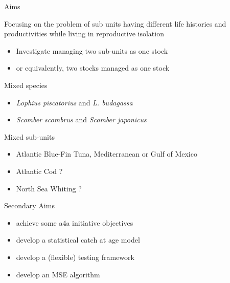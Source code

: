 \documentclass{beamer}
\begin{document}
\begin{withoutheadline}
\begin{frame}{Aims}

  Focusing on the problem of sub units having different life histories and productivities while living in reproductive isolation

  \begin{itemize}
      \item Investigate managing two sub-units as one stock
      \item or equivalently, two stocks managed as one stock
  \end{itemize}

  \pause  
  Mixed species
  \begin{itemize}
    \item \textit{Lophius piscatorius} and \textit{L. budagassa}
    \item \textit{Scomber scombrus} and \textit{Scomber japonicus}
  \end{itemize}
  \vspace{.25cm}
  Mixed sub-units
  \begin{itemize}
    \item Atlantic Blue-Fin Tuna, Mediterranean or Gulf of Mexico
    \item Atlantic Cod ?
    \item North Sea Whiting ?
  \end{itemize}

\end{frame}
\end{withoutheadline}

\begin{withoutheadline}
\begin{frame}{Secondary Aims}
  \begin{itemize}
      \item achieve some a4a initiative objectives
      \item develop a statistical catch at age model
      \item develop a (flexible) testing framework
      \item develop an MSE algorithm
  \end{itemize}
\end{frame}
\end{withoutheadline}
\end{document}
